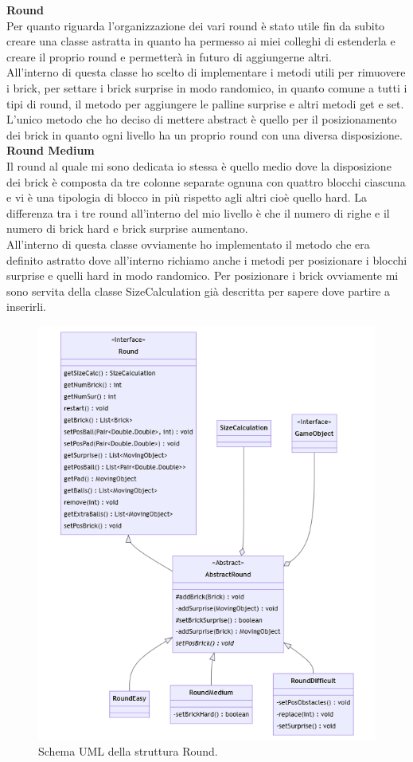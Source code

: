 \documentclass[a4paper,12pt]{report}
\begin{document}
\textbf{Round}\\
Per quanto riguarda l'organizzazione dei vari round è stato utile fin da subito creare una classe astratta in quanto ha permesso ai miei colleghi di estenderla e creare il proprio round e permetterà in futuro
di aggiungerne altri.
\\All'interno di questa classe ho scelto di implementare i metodi utili per rimuovere i brick, per settare i brick surprise in modo randomico, in quanto
comune a tutti i tipi di round, il metodo per aggiungere le palline surprise e altri metodi get e set.
\\L'unico metodo che ho deciso di mettere abstract è quello per il posizionamento dei brick in quanto ogni livello ha un proprio
round con una diversa disposizione.\\
\textbf{Round Medium}
\\Il round al quale mi sono dedicata io stessa è quello medio dove la disposizione dei brick è composta
da tre colonne separate ognuna con quattro blocchi ciascuna e vi è una tipologia di blocco in più rispetto agli altri cioè quello hard.
La differenza tra i tre round all'interno del mio livello è che il numero di righe e il numero di brick hard e brick surprise aumentano.
\\All'interno di questa classe ovviamente ho implementato il metodo che era definito astratto dove all'interno
richiamo anche i metodi per posizionare i blocchi surprise e quelli hard in modo randomico. Per posizionare i brick ovviamente mi sono servita
della classe SizeCalculation già descritta per sapere dove partire a inserirli.
\begin{figure}[H]
    \centering{}
    \includegraphics[scale=0.65]{images/Round.png}
    \caption{Schema UML della struttura Round.}
    \label{images:Round}
\end{figure}
\end{document}
